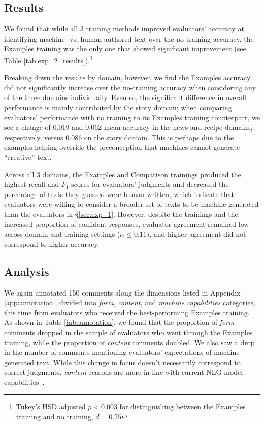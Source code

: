 \subsection{Results}
We found that while all 3 training methods improved evaluators' accuracy at identifying machine- vs. human-authored text over the no-training accuracy, the Examples training was the only one that showed significant improvement (see Table \ref{tab:exp_2_results}).\footnote{Tukey's HSD adjusted $p<0.003$ for distinguishing between the Examples training and no training, $d=0.25$}

Breaking down the results by domain, however, we find the Examples accuracy did not significantly increase over the no-training accuracy when considering any of the three domains individually.
Even so, the significant difference in overall performance is mainly contributed by the story domain;
when comparing evaluators' performance with no training to its Examples training counterpart, we see a change of 0.019 and 0.062 mean accuracy in the news and recipe domains, respectively, versus 0.086 on the story domain. 
This is perhaps due to the examples helping override the preconception that machines cannot generate ``creative'' text.

Across all 3 domains, the Examples and Comparison trainings produced the highest recall and $F_1$ scores for evaluators' judgments
and decreased the percentage of texts they guessed were human-written, which indicate that evaluators were willing to consider a broader set of texts to be machine-generated than the evaluators in \S\ref{sec:exp_1}. However, despite the trainings and the increased proportion of confident responses, evaluator agreement remained low across domain and training settings ($\alpha \leq 0.11)$, and higher agreement did not correspond to higher accuracy.

\subsection{Analysis}

We again annotated 150 comments along the dimensions listed in Appendix \ref{app:annotation}, divided into \textit{form}, \textit{content}, and \textit{machine capabilities} categories, this time from evaluators who received the best-performing Examples training.
As shown in Table \ref{tab:annotation}, we found that the proportion of \textit{form} comments dropped in the sample of evaluators who went through the Examples training, while the proportion of \textit{content} comments doubled. 
We also saw a drop in the number of comments mentioning evaluators' expectations of machine-generated text. While this change in focus doesn't necessarily correspond to correct judgments, \textit{content} reasons are more in-line with current NLG model capabilities~\cite{gpt3}.


